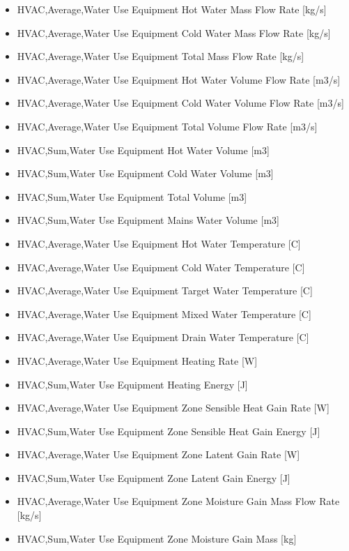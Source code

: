 \begin{itemize}
\item
  HVAC,Average,Water Use Equipment Hot Water Mass Flow Rate {[}kg/s{]}
\item
  HVAC,Average,Water Use Equipment Cold Water Mass Flow Rate {[}kg/s{]}
\item
  HVAC,Average,Water Use Equipment Total Mass Flow Rate {[}kg/s{]}
\item
  HVAC,Average,Water Use Equipment Hot Water Volume Flow Rate {[}m3/s{]}
\item
  HVAC,Average,Water Use Equipment Cold Water Volume Flow Rate {[}m3/s{]}
\item
  HVAC,Average,Water Use Equipment Total Volume Flow Rate {[}m3/s{]}
\item
  HVAC,Sum,Water Use Equipment Hot Water Volume {[}m3{]}
\item
  HVAC,Sum,Water Use Equipment Cold Water Volume {[}m3{]}
\item
  HVAC,Sum,Water Use Equipment Total Volume {[}m3{]}
\item
  HVAC,Sum,Water Use Equipment Mains Water Volume {[}m3{]}
\item
  HVAC,Average,Water Use Equipment Hot Water Temperature {[}C{]}
\item
  HVAC,Average,Water Use Equipment Cold Water Temperature {[}C{]}
\item
  HVAC,Average,Water Use Equipment Target Water Temperature {[}C{]}
\item
  HVAC,Average,Water Use Equipment Mixed Water Temperature {[}C{]}
\item
  HVAC,Average,Water Use Equipment Drain Water Temperature {[}C{]}
\item
  HVAC,Average,Water Use Equipment Heating Rate {[}W{]}
\item
  HVAC,Sum,Water Use Equipment Heating Energy {[}J{]}
\item
  HVAC,Average,Water Use Equipment Zone Sensible Heat Gain Rate {[}W{]}
\item
  HVAC,Sum,Water Use Equipment Zone Sensible Heat Gain Energy {[}J{]}
\item
  HVAC,Average,Water Use Equipment Zone Latent Gain Rate {[}W{]}
\item
  HVAC,Sum,Water Use Equipment Zone Latent Gain Energy {[}J{]}
\item
  HVAC,Average,Water Use Equipment Zone Moisture Gain Mass Flow Rate {[}kg/s{]}
\item
  HVAC,Sum,Water Use Equipment Zone Moisture Gain Mass {[}kg{]}
\end{itemize}

